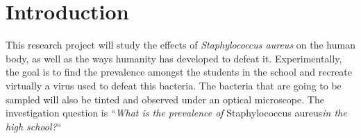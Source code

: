 \section{Introduction}
This research project will study the effects of \emph{Staphylococcus aureus} on the human body, as well as the ways humanity has developed to defeat it. Experimentally, the goal is to find the prevalence amongst the students in the school and recreate virtually a virus used to defeat this bacteria. The bacteria that are going to be sampled will also be tinted and observed under an optical microscope.\newline
The investigation question is ``\emph{What is the prevalence of} Staphylococcus aureus\emph{in the high school?}``
